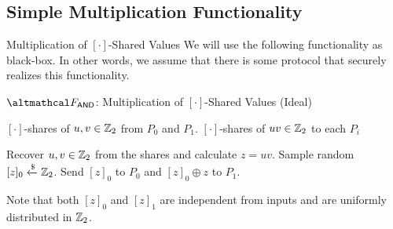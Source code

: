 \documentclass[../250326_cryptlab_flute_security.tex]{subfiles}
\begin{document}
\subsection{Simple Multiplication Functionality}

\begin{frame}{Multiplication of \([\cdot]\)-Shared Values}
    We will use the following functionality as black-box.
    In other words, we assume that there is some protocol that securely realizes this functionality.

    \begin{block}{\(\mcal{F}_\msf{AND}\): Multiplication of \([\cdot]\)-Shared Values (Ideal)}
        \begin{description}[Output]
            \ii[Input] \([\cdot]\)-shares of \(u, v \in \mathbb{Z}_2\) from \(P_0\) and \(P_1\).
            \ii[Output] \([\cdot]\)-shares of \(uv \in \mathbb{Z}_2\) to each \(P_i\)
        \end{description}
        \begin{enumerate}
            \ii
            Recover \(u, v \in \mathbb{Z}_2\) from the shares
            and calculate \(z = uv\).
            \ii
            Sample random \([z]_0 \xleftarrow{\$} \mathbb{Z}_2\).
            \ii
            Send \([z]_0\) to \(P_0\) and \([z]_0 \oplus z\) to \(P_1\).
        \end{enumerate}
    \end{block}

    \begin{exampleblock}{}
        Note that both \([z]_0\) and \([z]_1\) are
        independent from inputs and are uniformly distributed in \(\mathbb{Z}_2\).
    \end{exampleblock}
\end{frame}
\end{document}
